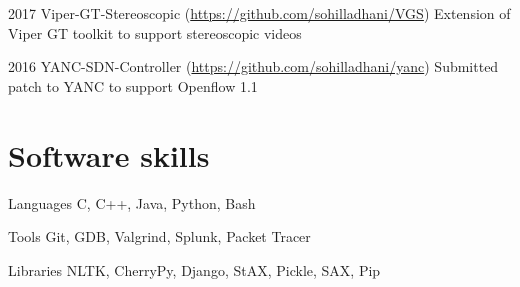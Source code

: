 \documentclass[fontsize=10pt]{tccv}
\begin{document}
\begin{yearlist}

\item{2017}
     {Viper-GT-Stereoscopic (\href{https://github.com/sohilladhani/ViPER-GT-Stereoscopic}{https://github.com/sohilladhani/VGS})}
        {Extension of Viper GT toolkit to support stereoscopic videos}

\item{2016}
     {YANC-SDN-Controller (\href{https://github.com/sohilladhani/yanc}{https://github.com/sohilladhani/yanc})}
     {Submitted patch to YANC to support Openflow 1.1}

\end{yearlist}


\section{Software skills}

\begin{factlist}

\item{Languages}
	{C, C++, Java, Python, Bash}

\item{Tools}
	{Git, GDB, Valgrind, Splunk, Packet Tracer}

\item{Libraries}
     {NLTK, CherryPy, Django, StAX, Pickle, SAX, Pip}

\end{factlist}
\end{document}
